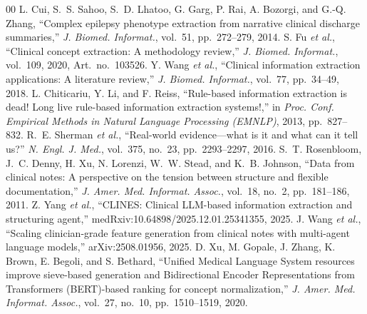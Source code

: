 \documentclass[conference]{IEEEtran}
\begin{document}
\begin{thebibliography}{00}
 L. Cui, S.~S. Sahoo, S.~D. Lhatoo, G. Garg, P. Rai, A. Bozorgi, and G.-Q. Zhang, ``Complex epilepsy phenotype extraction from narrative clinical discharge summaries,'' \emph{J. Biomed. Informat.}, vol.~51, pp.~272--279, 2014.
 S. Fu \emph{et al.}, ``Clinical concept extraction: A methodology review,'' \emph{J. Biomed. Informat.}, vol.~109, 2020, Art.~no.~103526.
 Y. Wang \emph{et al.}, ``Clinical information extraction applications: A literature review,'' \emph{J. Biomed. Informat.}, vol.~77, pp.~34--49, 2018.
 L. Chiticariu, Y. Li, and F. Reiss, ``Rule-based information extraction is dead! Long live rule-based information extraction systems!,'' in \emph{Proc. Conf. Empirical Methods in Natural Language Processing (EMNLP)}, 2013, pp.~827--832.
 R.~E. Sherman \emph{et al.}, ``Real-world evidence---what is it and what can it tell us?'' \emph{N. Engl. J. Med.}, vol.~375, no.~23, pp.~2293--2297, 2016.
 S.~T. Rosenbloom, J.~C. Denny, H. Xu, N. Lorenzi, W.~W. Stead, and K.~B. Johnson, ``Data from clinical notes: A perspective on the tension between structure and flexible documentation,'' \emph{J. Amer. Med. Informat. Assoc.}, vol.~18, no.~2, pp.~181--186, 2011.
 Z. Yang \emph{et al.}, ``CLINES: Clinical LLM-based information extraction and structuring agent,'' medRxiv:10.64898/2025.12.01.25341355, 2025.
 J. Wang \emph{et al.}, ``Scaling clinician-grade feature generation from clinical notes with multi-agent language models,'' arXiv:2508.01956, 2025.
 D. Xu, M. Gopale, J. Zhang, K. Brown, E. Begoli, and S. Bethard, ``Unified Medical Language System resources improve sieve-based generation and Bidirectional Encoder Representations from Transformers (BERT)-based ranking for concept normalization,'' \emph{J. Amer. Med. Informat. Assoc.}, vol.~27, no.~10, pp.~1510--1519, 2020.

\end{thebibliography}

\vspace{12pt}
\end{document}
